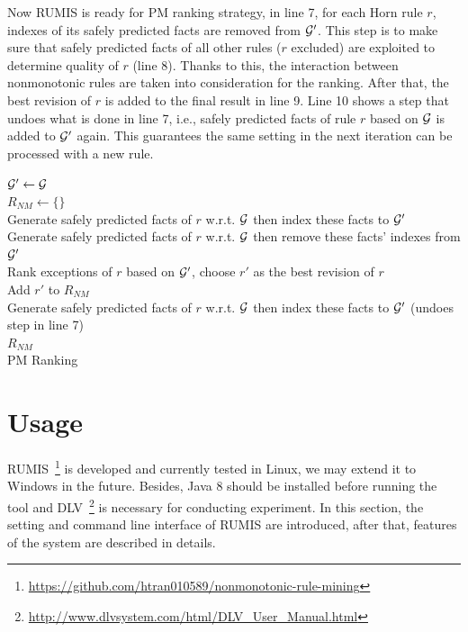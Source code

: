 Now RUMIS is ready for PM ranking strategy, in line 7, for each Horn rule $r$, indexes of its safely predicted facts are removed from $\mathcal{G}'$. This step is to make sure that safely predicted facts of all other rules ($r$ excluded) are exploited to determine quality of $r$ (line 8). Thanks to this, the interaction between nonmonotonic rules are taken into consideration for the ranking. After that, the best revision of $r$ is added to the final result in line 9. Line 10 shows a step that undoes what is done in line 7, i.e., safely predicted facts of rule $r$ based on $\mathcal{G}$ is added to $\mathcal{G}'$ again. This guarantees the same setting in the next iteration can be processed with a new rule.

\IncMargin{1.5em}
\begin{algorithm}[H]
\DontPrintSemicolon
\SetAlgoLined
{}
\BlankLine
$\mathcal{G}' \leftarrow \mathcal{G}$\\
$R_{NM} \leftarrow \{\}$\\
\BlankLine
{} {
	Generate safely predicted facts of $r$ w.r.t. $\mathcal{G}$ then index these facts to $\mathcal{G}'$\\
}
\BlankLine
{} {
	Generate safely predicted facts of $r$ w.r.t. $\mathcal{G}$ then remove these facts' indexes from $\mathcal{G}'$\\
	Rank exceptions of $r$ based on $\mathcal{G}'$, choose $r'$ as the best revision of $r$\\
	Add $r'$ to $R_{NM}$\\
	Generate safely predicted facts of $r$ w.r.t. $\mathcal{G}$ then index these facts to $\mathcal{G}'$ (undoes step in line 7)\\
}
\Return $R_{NM}$\\
\caption{PM Ranking}
\label{pm_ranking_algo}
\end{algorithm}
\DecMargin{1.5em}

\section{Usage}

RUMIS~\footnote{\url{https://github.com/htran010589/nonmonotonic-rule-mining}} is developed and currently tested in Linux, we may extend it to Windows in the future. Besides, Java 8 should be installed before running the tool and DLV~\footnote{\url{http://www.dlvsystem.com/html/DLV_User_Manual.html}} is necessary for conducting experiment. In this section, the setting and command line interface of RUMIS are introduced, after that, features of the system are described in details.

